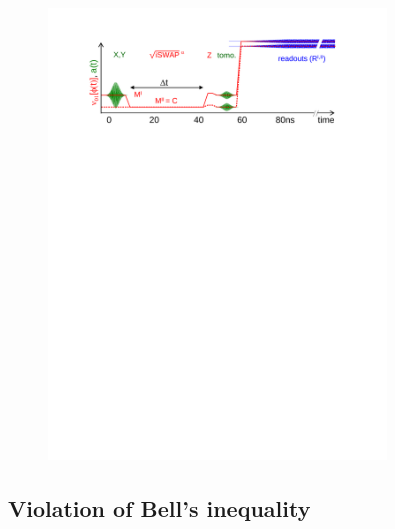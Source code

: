 \begin{figure}
	\centering
		\includegraphics[width=0.8\textwidth]{./material/papers/iswap/figures/iswap_gate_pulse_sequence}
	\label{fig:ISwapPulseSequence}
	\caption{}
\end{figure}






\subsection{Violation of Bell's inequality}

